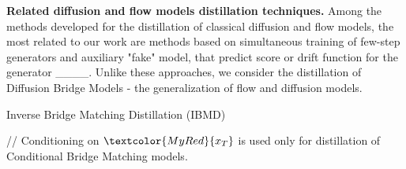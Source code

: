 \textbf{Related diffusion and flow models distillation techniques.} 
Among the methods developed for the distillation of classical diffusion and flow models, the most related to our work are methods based on simultaneous training of few-step generators and auxiliary "fake" model, that predict score or drift function for the generator ____. Unlike these approaches, we consider the distillation of Diffusion Bridge Models - the generalization of flow and diffusion models.
\vspace{0mm}
\begin{algorithm}[h]
    \caption{Inverse Bridge Matching Distillation (IBMD)}\label{alg:ibmd}
    // Conditioning on $\textcolor{MyRed}{x_T}$ is used only for distillation of Conditional Bridge Matching models. \\
\end{algorithm}
